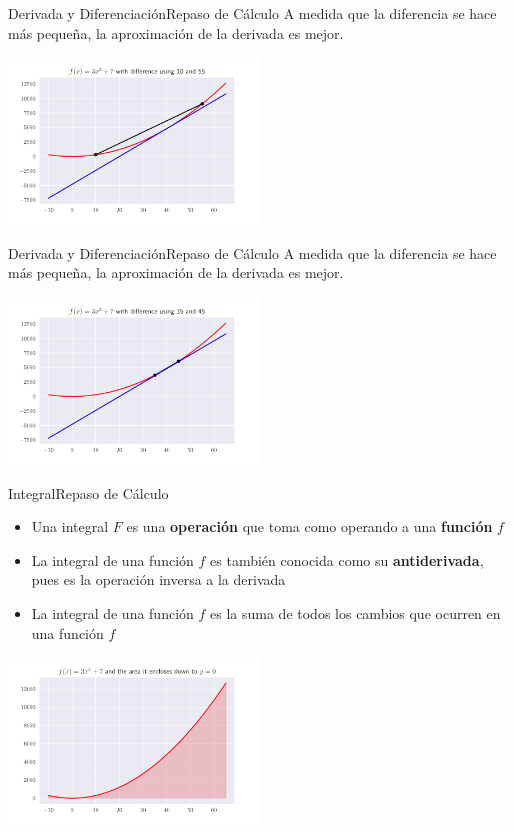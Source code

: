 \documentclass[spanish, c, dvipsnames]{beamer}
\begin{document}
\begin{frame}{Derivada y Diferenciación}{Repaso de Cálculo}
    A medida que la diferencia se hace más pequeña, la aproximación de la derivada es mejor.

    \begin{center}
        \includegraphics[width=0.5\textwidth]{diff02.pdf}
    \end{center}
\end{frame}

\begin{frame}{Derivada y Diferenciación}{Repaso de Cálculo}
    A medida que la diferencia se hace más pequeña, la aproximación de la derivada es mejor.

    \begin{center}
        \includegraphics[width=0.5\textwidth]{diff03.pdf}
    \end{center}
\end{frame}

\begin{frame}{Integral}{Repaso de Cálculo}
    \begin{itemize}
        \item Una \alert{integral} $F$ es una \textbf{operación} que toma como operando a una \textbf{función} $f$
        \item La integral de una función $f$ es también conocida como su \textbf{antiderivada}, pues es la operación inversa a la derivada
        \item La integral de una función $f$ es la suma de todos los cambios que ocurren en una función $f$
    \end{itemize}

    \begin{center}
        \includegraphics[width=0.5\textwidth]{area.pdf}
    \end{center}
\end{frame}
\end{document}
